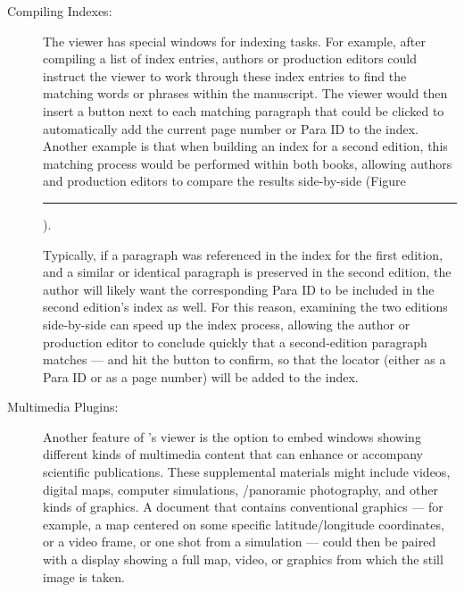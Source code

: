 \documentclass[11pt]{article}
\newcommand\reduline{\bgroup\markoverwith
{\textcolor{ru}{\rule[-.25ex]{3pt}{3.4pt}}}\ULon}
\DeclareRobustCommand{\xfigunderline}[1]{\reduline{#1}
\llap{\dashuline{\phantom{#1}}}%
}
\renewcommand{\Atref}[1]{\textcolor{rgrAt!30}{\xfigunderline{\hspace{-2pt}\autoref{#1}\hspace*{-2pt}}}}
\begin{document}
{\begin{description}
\item[\textbullet{}Compiling Indexes:] \hspace*{-16pt}  The \PacTk{} \PDF{} viewer 
has special windows for indexing tasks.  For example, after 
compiling a list of index entries, authors or production editors 
could instruct the \PDF{} viewer to work through these index 
entries to find the matching words or phrases within the 
manuscript.  The \PDF{} viewer would then insert a button next 
to each matching paragraph that could be clicked to 
automatically add the current page number or Para ID to the index. 
Another example is that 
when building an index for a second edition, 
this matching process would be performed within both books, 
allowing authors and production editors to compare the results 
side-by-side (Figure~\Atref{fig:f3}).

\vspace{5pt}

Typically, if a paragraph was referenced in the 
index for the first edition, and a similar or identical 
paragraph is preserved in the second edition, the author 
will likely want the corresponding Para ID to be 
included in the second edition's index as well.  
For this reason, examining the two editions 
side-by-side can speed up the index process, allowing 
the author or production editor to conclude quickly that a 
second-edition paragraph matches --- and hit the  
button to confirm, so that the locator (either as a Para ID 
or as a page number) will be added to the index.

\item[\textbullet{}Multimedia Plugins:] \hspace*{-16pt}  Another 
feature of \PacTk{}'s \PDF{} viewer is the option 
to embed windows showing different kinds of multimedia content 
that can enhance or accompany scientific publications.  
These supplemental materials might include videos, 
digital maps, computer simulations, 
\ThreeD{}/panoramic photography, and other kinds 
of \ThreeD{} graphics.  A \PDF{} document 
that contains conventional \TwoD{} graphics --- for 
example, a map centered on some specific latitude/longitude 
coordinates, or a video frame, or one shot from a simulation 
--- could then be paired with a \GUI{} 
display showing a full map, video, or \ThreeD{} graphics 
from which the still image is taken.

\vspace*{9pt}



\end{description}}
\end{document}
